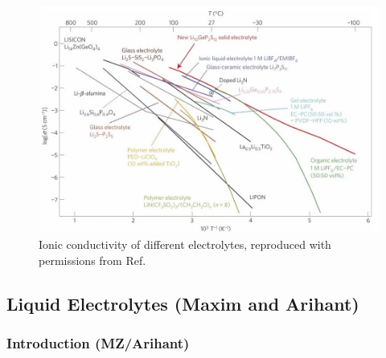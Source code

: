 \documentclass[../main.tex]{subfiles}
\begin{document}
\begin{figure}[htbp]
    \centering
    \includegraphics[scale=0.6]{figures/conductivity.jpg}
    \caption{Ionic conductivity of different electrolytes, reproduced with permissions from Ref. }
    \label{fig:conductivity}
\end{figure}





\subsection{Liquid Electrolytes (Maxim and Arihant)}
\label{sec:Liquid_electrolytes}
\subsubsection{Introduction (MZ/Arihant)}

\end{document}
